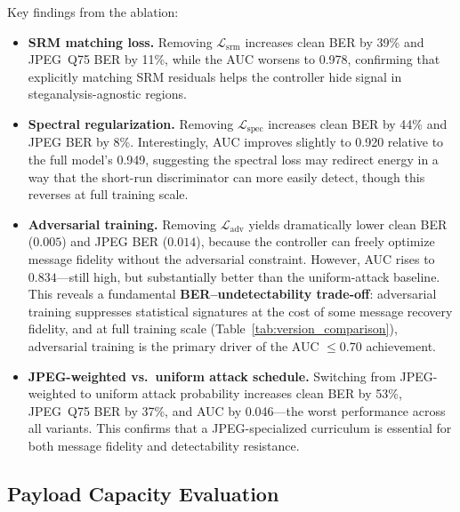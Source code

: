 \documentclass[journal]{IEEEtran}
\newcommand{\Lcal}{\mathcal{L}}
\begin{document}
Key findings from the ablation:
\begin{itemize}[itemsep=2pt,topsep=2pt]
    \item \textbf{SRM matching loss.}
          Removing $\Lcal_\text{srm}$ increases clean BER by 39\% and JPEG~Q75 BER by 11\%,
          while the AUC worsens to 0.978, confirming that explicitly matching SRM residuals
          helps the controller hide signal in steganalysis-agnostic regions.

    \item \textbf{Spectral regularization.}
          Removing $\Lcal_\text{spec}$ increases clean BER by 44\% and JPEG BER by 8\%.
          Interestingly, AUC improves slightly to 0.920 relative to the full model's 0.949,
          suggesting the spectral loss may redirect energy in a way that the short-run
          discriminator can more easily detect, though this reverses at full training scale.

    \item \textbf{Adversarial training.}
          Removing $\Lcal_\text{adv}$ yields dramatically lower clean BER ($0.005$) and
          JPEG BER ($0.014$), because the controller can freely optimize message fidelity
          without the adversarial constraint.
          However, AUC rises to $0.834$---still high, but substantially better than the
          uniform-attack baseline.
          This reveals a fundamental \textbf{BER--undetectability trade-off}: adversarial
          training suppresses statistical signatures at the cost of some message recovery
          fidelity, and at full training scale (Table~\ref{tab:version_comparison}),
          adversarial training is the primary driver of the AUC $\leq 0.70$ achievement.

    \item \textbf{JPEG-weighted vs.\ uniform attack schedule.}
          Switching from JPEG-weighted to uniform attack probability increases clean BER by
          53\%, JPEG~Q75 BER by 37\%, and AUC by 0.046---the worst performance across all
          variants.
          This confirms that a JPEG-specialized curriculum is essential for both message
          fidelity and detectability resistance.
\end{itemize}

\subsection{Payload Capacity Evaluation}
\label{sec:capacity}
\end{document}
